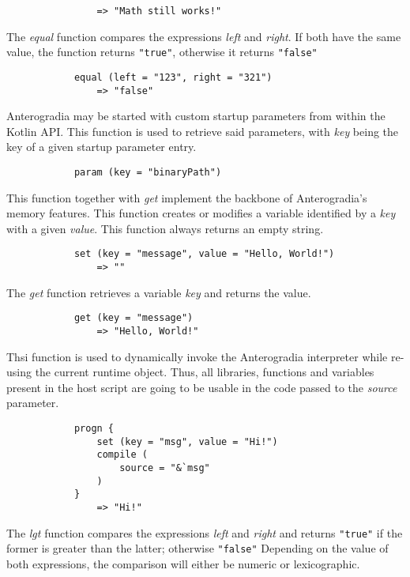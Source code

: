 \begin{multicols*}{2}
\begin{verbatim}
			    => "Math still works!"
    \end{verbatim}
    \spacing
    The \textit{equal} function compares the expressions \textit{left} and \textit{right}. If both have the same value,
    the function returns \verb|"true"|, otherwise it returns \verb|"false"|
    \begin{verbatim}
			equal (left = "123", right = "321")
			    => "false"
    \end{verbatim}
    \spacing
    Anterogradia may be started with custom startup parameters from within the Kotlin API. This function is used to retrieve said parameters,
    with \textit{key} being the key of a given startup parameter entry.
    \begin{verbatim}
			param (key = "binaryPath")
    \end{verbatim}
	\columnbreak
    This function together with \textit{get} implement the backbone of Anterogradia's memory features. This function creates or modifies
    a variable identified by a \textit{key} with a given \textit{value}. This function always returns an empty string.
    \begin{verbatim}
			set (key = "message", value = "Hello, World!")
			    => ""
    \end{verbatim}
    \spacing
    The \textit{get} function retrieves a variable \textit{key} and returns the value.
    \begin{verbatim}
			get (key = "message")
			    => "Hello, World!"
    \end{verbatim}
    \spacing
    Thsi function is used to dynamically invoke the Anterogradia interpreter while re-using the current runtime object. Thus, all
    libraries, functions and variables present in the host script are going to be usable in the code passed to the \textit{source}
    parameter.
    \begin{verbatim}
			progn {
			    set (key = "msg", value = "Hi!")
			    compile (
			        source = "&`msg"
			    )
			}
			    => "Hi!"
    \end{verbatim}
    The \textit{lgt} function compares the expressions \textit{left} and \textit{right} and returns \verb|"true"| if
    the former is greater than the latter; otherwise \verb|"false"| Depending on the value of both expressions, the comparison will either be
    numeric or lexicographic.
    \begin{verbatim}

\end{verbatim}
\end{multicols*}
